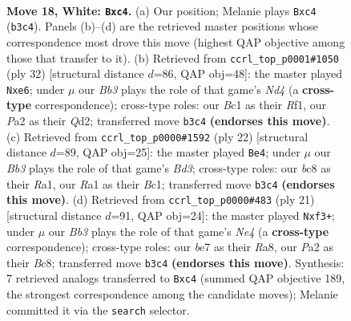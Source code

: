 \documentclass[11pt]{article}
\begin{document}
\clearpage

\begin{figure}[p]\centering
\begin{subfigure}{0.46\textwidth}\centering
\resizebox{\linewidth}{!}{%
\newchessgame
\chessboard[
  setfen={rnbqk2r/4b3/p2p4/3PppN1/2p3p1/1B6/PPPQ1PP1/R1B1RK2 w kq - 0 18},
  showmover=false,
  pgfstyle=straightmove, color=movearrow, markmove={b3-c4}
]}
\caption{}
\end{subfigure}\hfill
\begin{subfigure}{0.46\textwidth}\centering
\resizebox{\linewidth}{!}{%
\newchessgame
\chessboard[
  setfen={r3k2r/3qbppp/p3b3/2ppP3/3N4/1PP1B3/3Q1PPP/R4RK1 w kq - 0 17},
  showmover=false,
  pgfstyle=straightmove, color=movearrow, markmove={d4-e6}
]}
\caption{}
\end{subfigure}
\\[4pt]
\begin{subfigure}{0.46\textwidth}\centering
\resizebox{\linewidth}{!}{%
\newchessgame
\chessboard[
  setfen={r3kb1r/pp3ppp/2b1p3/3q4/3p4/3B4/PPPP1PPP/R1BQR1K1 w kq - 4 12},
  showmover=false,
  pgfstyle=straightmove, color=movearrow, markmove={d3-e4}
]}
\caption{}
\end{subfigure}\hfill
\begin{subfigure}{0.46\textwidth}\centering
\resizebox{\linewidth}{!}{%
\newchessgame
\chessboard[
  setfen={r1b1kb1r/pp3p1p/2pp1q2/4n3/3PPp1P/2N2B2/PPP3P1/R1BQK2R b KQkq - 0 11},
  showmover=false,
  pgfstyle=straightmove, color=movearrow, markmove={e5-f3}
]}
\caption{}
\end{subfigure}
\caption{\textbf{Move 18, White: \texttt{Bxc4}.} (a) Our position; Melanie plays \texttt{Bxc4} (\texttt{b3c4}). Panels (b)--(d) are the retrieved master positions whose correspondence most drove this move (highest QAP objective among those that transfer to it). (b) Retrieved from \texttt{ccrl\_top\_p0001\#1050} (ply 32) [structural distance $d$=86, QAP obj=48]: the master played \texttt{Nxe6}; under $\mu$ our \emph{Bb3} plays the role of that game's \emph{Nd4} (a \textbf{cross-type} correspondence); cross-type roles: our \emph{B}c1 as their \emph{R}f1, our \emph{P}a2 as their \emph{Q}d2; transferred move \texttt{b3c4} \textbf{(endorses this move)}. (c) Retrieved from \texttt{ccrl\_top\_p0000\#1592} (ply 22) [structural distance $d$=89, QAP obj=25]: the master played \texttt{Be4}; under $\mu$ our \emph{Bb3} plays the role of that game's \emph{Bd3}; cross-type roles: our \emph{b}c8 as their \emph{R}a1, our \emph{R}a1 as their \emph{B}c1; transferred move \texttt{b3c4} \textbf{(endorses this move)}. (d) Retrieved from \texttt{ccrl\_top\_p0000\#483} (ply 21) [structural distance $d$=91, QAP obj=24]: the master played \texttt{Nxf3+}; under $\mu$ our \emph{Bb3} plays the role of that game's \emph{Ne4} (a \textbf{cross-type} correspondence); cross-type roles: our \emph{b}e7 as their \emph{R}a8, our \emph{P}a2 as their \emph{B}c8; transferred move \texttt{b3c4} \textbf{(endorses this move)}. Synthesis: 7 retrieved analogs transferred to \texttt{Bxc4} (summed QAP objective 189, the strongest correspondence among the candidate moves); Melanie committed it via the \texttt{search} selector.}
\label{fig:thought-m34}
\end{figure}
\end{document}
